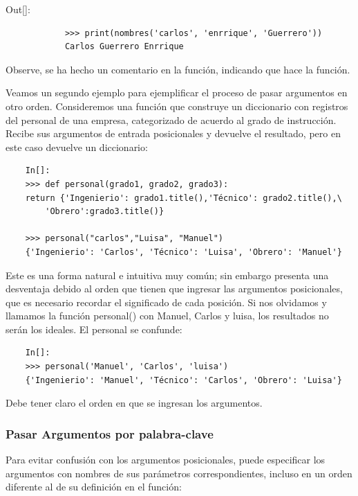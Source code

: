 {\ttfamily\scriptsize \noindent Out[]:\vspace{-0.7cm}	
	{\color{blue}
		\begin{verbatim}		 	
			>>> print(nombres('carlos', 'enrrique', 'Guerrero'))
			Carlos Guerrero Enrrique	
		\end{verbatim}
}}

Observe, se ha hecho un comentario en la función, indicando que hace la función.

Veamos un segundo ejemplo para ejemplificar el proceso de pasar argumentos en otro orden. 
Consideremos una función que construye un diccionario con registros del personal de una empresa, categorizado de acuerdo al grado de instrucción.  Recibe sus argumentos de entrada posicionales y devuelve el resultado, pero en este caso devuelve un diccionario:

\begin{lstlisting}
	In[]:
	>>> def personal(grado1, grado2, grado3):
	return {'Ingenierio': grado1.title(),'Técnico': grado2.title(),\
		'Obrero':grado3.title()}
	
	>>> personal("carlos","Luisa", "Manuel")
	{'Ingenierio': 'Carlos', 'Técnico': 'Luisa', 'Obrero': 'Manuel'}
\end{lstlisting}

Este es una forma natural e intuitiva muy común; sin embargo presenta una desventaja debido al orden que tienen que ingresar las argumentos posicionales, que es necesario recordar el significado de cada posición. Si nos olvidamos y llamamos la función {\ttfamily personal()} con Manuel, Carlos y luisa, los resultados no serán los ideales. El personal se confunde: 

\begin{lstlisting}
	In[]:	
	>>> personal('Manuel', 'Carlos', 'luisa')
	{'Ingenierio': 'Manuel', 'Técnico': 'Carlos', 'Obrero': 'Luisa'}
\end{lstlisting}

Debe tener claro el orden en que se ingresan los argumentos.

\subsubsection{Pasar Argumentos por palabra-clave}

Para evitar confusión con los argumentos posicionales, puede especificar los argumentos con nombres de
sus parámetros correspondientes, incluso en un orden diferente al de su definición en el función:

